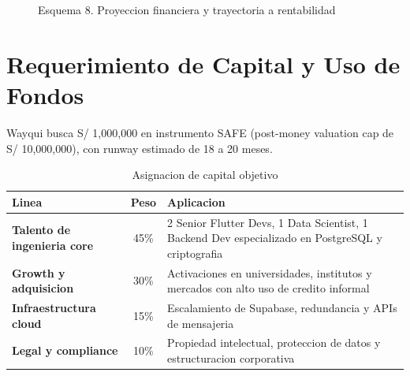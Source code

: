 \documentclass[11pt,a4paper]{article}
\begin{document}
\begin{figure}[htbp]
\centering
{}
\caption{Esquema 8. Proyeccion financiera y trayectoria a rentabilidad}
\label{fig:proyeccion-financiera}
\end{figure}

\section{Requerimiento de Capital y Uso de Fondos}
Wayqui busca S/ 1,000,000 en instrumento SAFE (post-money valuation cap de S/ 10,000,000), con runway estimado de 18 a 20 meses.

\begin{table}[htbp]
\centering
\caption{Asignacion de capital objetivo}
\begin{tabularx}{\textwidth}{>{\bfseries}p{4.2cm}c X}
\toprule
Linea & Peso & Aplicacion \\
\midrule
Talento de ingenieria core & 45\% & 2 Senior Flutter Devs, 1 Data Scientist, 1 Backend Dev especializado en PostgreSQL y criptografia \\
Growth y adquisicion & 30\% & Activaciones en universidades, institutos y mercados con alto uso de credito informal \\
Infraestructura cloud & 15\% & Escalamiento de Supabase, redundancia y APIs de mensajeria \\
Legal y compliance & 10\% & Propiedad intelectual, proteccion de datos y estructuracion corporativa \\
\bottomrule
\end{tabularx}
\end{table}
\end{document}
